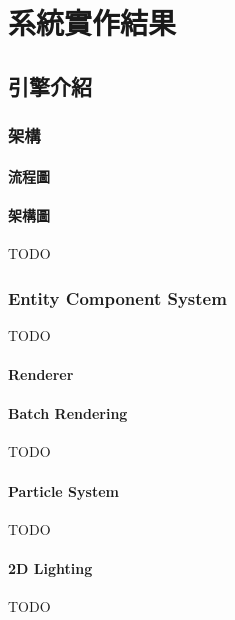 \chapter{系統實作結果}

\section{引擎介紹}

\subsection{架構}

\subsubsection{流程圖} %
\label{ssub:流程圖}


\subsubsection{架構圖} %
\label{ssub:架構圖}
TODO

\subsection{Entity Component System} %
\label{sub:Entity Component System}
TODO

\subsubsection{Renderer} %
\label{ssub:Renderer}

\subsubsection{Batch Rendering} %
\label{ssub:Batch Rendering}
TODO

\subsubsection{Particle System} %
\label{ssub:Particle System}
TODO

\subsubsection{2D Lighting} %
\label{ssub:2D Lighting}
TODO

